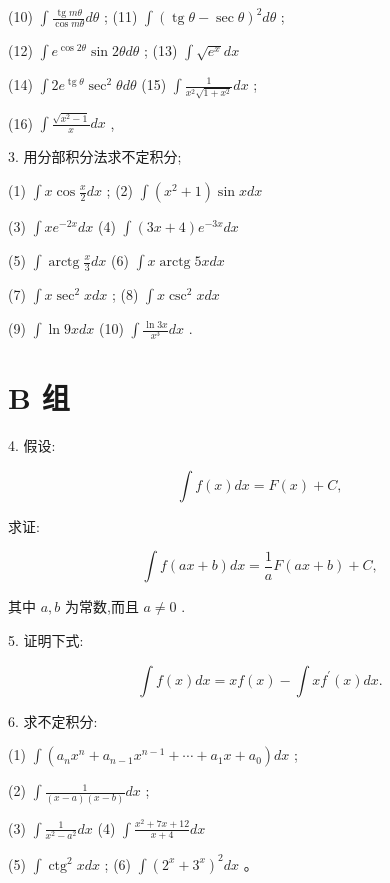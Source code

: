 \documentclass[lang=cn,newtx,10pt,scheme=chinese]{elegantbook}
\begin{document}
(10) \(\int \frac{\operatorname{tg}{m\theta }}{\cos {m\theta }}{d\theta }\) ; (11) \(\int {\left( \operatorname{tg}\theta - \sec \theta \right) }^{2}{d\theta }\) ;

(12) \(\int {e}^{\cos {2\theta }}\sin {2\theta d\theta }\) ; (13) \(\int \sqrt{{e}^{x}}{dx}\)

(14) \(\int 2{e}^{\operatorname{tg}\theta }{\sec }^{2}{\theta d\theta }\) (15) \(\int \frac{1}{{x}^{2}\sqrt{1 + {x}^{2}}}{dx}\) ;

(16) \(\int \frac{\sqrt{{x}^{2} - 1}}{x}{dx}\) ,

3. 用分部积分法求不定积分;

(1) \(\int x\cos \frac{x}{2}{dx}\) ; (2) \(\int \left( {{x}^{2} + 1}\right) \sin {xdx}\)

(3) \(\int x{e}^{-{2x}}{dx}\) (4) \(\int \left( {{3x} + 4}\right) {e}^{-{3x}}{dx}\)

(5) \(\int \operatorname{arctg}\frac{x}{3}{dx}\) (6) \(\int x\operatorname{arctg}{5xdx}\)

(7) \(\int x{\sec }^{2}{xdx}\) ; (8) \(\int x{\csc }^{2}{xdx}\)

(9) \(\int \ln {9xdx}\) (10) \(\int \frac{\ln {3x}}{{x}^{3}}{dx}\) .

\section*{B 组}

4. 假设:

\[
\int f\left( x\right) {dx} = F\left( x\right) + C,
\]

求证:

\[
\int f\left( {{ax} + b}\right) {dx} = \frac{1}{a}F\left( {{ax} + b}\right) + C,
\]

其中 \(a,b\) 为常数,而且 \(a \neq 0\) .

5. 证明下式:

\[
\int f\left( x\right) {dx} = {xf}\left( x\right) - \int x{f}^{\prime }\left( x\right) {dx}.
\]

6. 求不定积分:

(1) \(\int \left( {{a}_{n}{x}^{n} + {a}_{n - 1}{x}^{n - 1} + \cdots + {a}_{1}x + {a}_{0}}\right) {dx}\) ;

(2) \(\int \frac{1}{\left( {x - a}\right) \left( {x - b}\right) }{dx}\) ;

(3) \(\int \frac{1}{{x}^{2} - {a}^{2}}{dx}\) (4) \(\int \frac{{x}^{2} + {7x} + {12}}{x + 4}{dx}\)

(5) \(\int {\operatorname{ctg}}^{2}{xdx}\) ; (6) \(\int {\left( {2}^{x} + {3}^{x}\right) }^{2}{dx}\) 。
\end{document}
